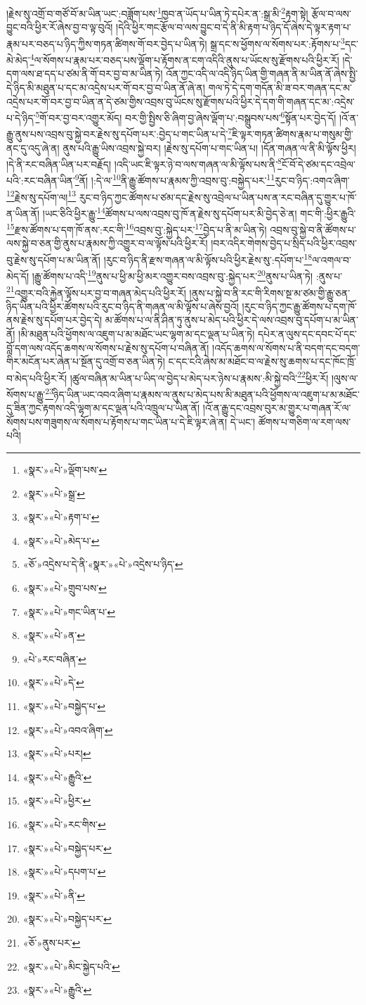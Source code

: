 །རྗེས་སུ་འགྲོ་བ་གཙོ་བོ་མ་ཡིན་ཡང་:བཟློག་པས་\footnote{«སྣར་»«པེ་»ལྡོག་པས་}ཁྱབ་ན་ཡོད་པ་ཡིན་ཏེ་དཔེར་ན་:སྒྲ་མི་\footnote{«སྣར་»«པེ་»སྒྲ་}རྟག་སྟེ། རྩོལ་བ་ལས་བྱུང་བའི་ཕྱིར་རོ་ཞེས་བྱ་བ་ལྟ་བུའོ། །དེའི་ཕྱིར་གང་རྩོལ་བ་ལས་བྱུང་བ་དེ་ནི་མི་རྟག་པ་ཉིད་དོ་ཞེས་དེ་ལྟར་རྟག་པ་རྣམ་པར་བཅད་པ་ཉིད་ཀྱིས་གཏན་ཚིགས་གོ་བར་བྱེད་པ་ཡིན་ཏེ། སྒྲ་དང་ས་ཕྱོགས་ལ་སོགས་པར་:རྟོགས་པ་\footnote{«སྣར་»«པེ་»རྟག་པ་}དང་མེ་མེད་\footnote{«སྣར་»«པེ་»མེད་པ་}ལ་སོགས་པ་རྣམ་པར་བཅད་པས་ལྡོག་པ་རྟོགས་ན་ངག་འདིའི་ནུས་པ་ཡོངས་སུ་རྫོགས་པའི་ཕྱིར་རོ། །དེ་དག་ལས་ཐ་དད་པ་ཙམ་ནི་གོ་བར་བྱ་བ་མ་ཡིན་ཏེ། འོན་ཀྱང་འདི་ལ་འདི་ཉིད་ཡིན་གྱི་གཞན་ནི་མ་ཡིན་ནོ་ཞེས་སྤྱི་དེ་ཉིད་མི་མཐུན་པ་དང་མ་འདྲེས་པར་གོ་བར་བྱ་བ་ཡིན་ནོ་ཞེ་ན། གལ་ཏེ་དེ་དག་གདོན་མི་ཟ་བར་གཞན་དང་མ་འདྲེས་པར་གོ་བར་བྱ་བ་ཡིན་ན་དེ་ཙམ་གྱིས་འབྲས་བུ་ཡོངས་སུ་རྫོགས་པའི་ཕྱིར་དེ་དག་གི་གཞན་དང་མ་:འདྲེས་པ་དེ་ཉིད་\footnote{«ཅོ་»འདྲེས་པ་དེ་ནི་«སྣར་»«པེ་»འདྲེས་པ་ཉིད་}གོ་བར་བྱ་བར་འགྱུར་མོད། བར་གྱི་སྤྱིས་ཅི་ཞིག་བྱ་ཞེས་ལྡོག་པ་:བསྒྲུབས་པས་\footnote{«སྣར་»«པེ་»གྲུབ་པས་}སྟོན་པར་བྱེད་དོ། །འོ་ན་རྒྱུ་ནུས་པས་འབྲས་བུ་སྐྱེ་བར་རྗེས་སུ་དཔོག་པར་:བྱེད་པ་གང་ཡིན་པ་དེ་\footnote{«སྣར་»«པེ་»གང་ཡིན་པ་}ཇི་ལྟར་གཏན་ཚིགས་རྣམ་པ་གསུམ་གྱི་ནང་དུ་འདུ་ཞེ་ན། ནུས་པའི་རྒྱུ་ཡིས་འབྲས་སྐྱེ་བར། །རྗེས་སུ་དཔོག་པ་གང་ཡིན་པ། །དོན་གཞན་ལ་ནི་མི་ལྟོས་ཕྱིར། །དེ་ནི་རང་བཞིན་ཡིན་པར་བརྗོད། །འདི་ཡང་ཇི་ལྟར་ཉེ་བ་ལས་གཞན་ལ་མི་ལྟོས་པས་ནི་\footnote{«སྣར་»«པེ་»ན་}ངོ་བོ་དེ་ཙམ་དང་འབྲེལ་པའི་:རང་བཞིན་ཡིན་\footnote{«པེ་»རང་བཞིན་}ནོ། །:དེ་ལ་\footnote{«སྣར་»«པེ་»དེ་}ནི་རྒྱུ་ཚོགས་པ་རྣམས་ཀྱི་འབྲས་བུ་:བསྐྱེད་པར་\footnote{«སྣར་»«པེ་»བསྐྱེད་པ་}རུང་བ་ཉིད་:འགའ་ཞིག་\footnote{«སྣར་»«པེ་»འབའ་ཞིག་}རྗེས་སུ་དཔོག་ལ།\footnote{«སྣར་»«པེ་»པར།} རུང་བ་ཉིད་ཀྱང་ཚོགས་པ་ཙམ་དང་རྗེས་སུ་འབྲེལ་པ་ཡིན་པས་ན་རང་བཞིན་དུ་གྱུར་པ་ཁོ་ན་ཡིན་ནོ། །ཡང་ཅིའི་ཕྱིར་རྒྱུ་\footnote{«སྣར་»«པེ་»རྒྱུའི་}ཚོགས་པ་ལས་འབྲས་བུ་ཁོ་ན་རྗེས་སུ་དཔོག་པར་མི་བྱེད་ཅེ་ན། གང་གི་:ཕྱིར་རྒྱུའི་\footnote{«སྣར་»«པེ་»ཕྱིར་}རྫས་ཚོགས་པ་དག་ཁོ་ནས་:རང་གི་\footnote{«སྣར་»«པེ་»རང་གིས་}འབྲས་བུ་:སྐྱེད་པར་\footnote{«སྣར་»«པེ་»བསྐྱེད་པར་}བྱེད་པ་ནི་མ་ཡིན་ཏེ། འབྲས་བུ་སྐྱེ་བ་ནི་ཚོགས་པ་ལས་སྐྱེ་བ་ཅན་གྱི་ནུས་པ་རྣམས་ཀྱི་འགྱུར་བ་ལ་ལྟོས་པའི་ཕྱིར་རོ། །བར་འདིར་གེགས་བྱེད་པ་སྲིད་པའི་ཕྱིར་འབྲས་བུ་རྗེས་སུ་དཔོག་པ་མ་ཡིན་ནོ། །རུང་བ་ཉིད་ནི་རྫས་གཞན་ལ་མི་ལྟོས་པའི་ཕྱིར་རྗེས་སུ་:དཔོག་པ་\footnote{«སྣར་»«པེ་»དཔག་པ་}ལ་འགལ་བ་མེད་དོ། །རྒྱུ་ཚོགས་པ་འདི་\footnote{«སྣར་»«པེ་»ནི་}ནུས་པ་ཕྱི་མ་ཕྱི་མར་འགྱུར་བས་འབྲས་བུ་:སྐྱེད་པར་\footnote{«སྣར་»«པེ་»བསྐྱེད་པར་}ནུས་པ་ཡིན་ཏེ། :ནུས་པ་\footnote{«ཅོ་»ནུས་པར་}འགྱུར་བའི་རྐྱེན་ལྟོས་པར་བྱ་བ་གཞན་མེད་པའི་ཕྱིར་རོ། །ནུས་པ་སྐྱེ་བ་ནི་རང་གི་རིགས་སྔ་མ་ཙམ་གྱི་རྒྱུ་ཅན་ཉིད་ཡིན་པའི་ཕྱིར་ཚོགས་པའི་རུང་བ་ཉིད་ནི་གཞན་ལ་མི་ལྟོས་པ་ཞེས་བྱའོ། །རུང་བ་ཉིད་ཀྱང་རྒྱུ་ཚོགས་པ་དག་ཁོ་ནས་རྗེས་སུ་དཔོག་པར་བྱེད་དེ། མ་ཚོགས་པ་ལ་ནི་ཤིན་ཏུ་ནུས་པ་མེད་པའི་ཕྱིར་དེ་ལས་འབྲས་བུ་དཔོག་པ་མ་ཡིན་ནོ། །མི་མཐུན་པའི་ཕྱོགས་ལ་འཇུག་པ་མ་མཐོང་ཡང་ལྷག་མ་དང་ལྡན་པ་ཡིན་ཏེ། དཔེར་ན་ལུས་དང་དབང་པོ་དང་བློ་དག་ལས་འདོད་ཆགས་ལ་སོགས་པ་རྗེས་སུ་དཔོག་པ་བཞིན་ནོ། །འདོད་ཆགས་ལ་སོགས་པ་ནི་བདག་དང་བདག་གིར་མངོན་པར་ཞེན་པ་སྔོན་དུ་འགྲོ་བ་ཅན་ཡིན་ཏེ། ང་དང་ངའི་ཞེས་མ་མཐོང་བ་ལ་རྗེས་སུ་ཆགས་པ་དང་ཁོང་ཁྲོ་བ་མེད་པའི་ཕྱིར་རོ། །ཚུལ་བཞིན་མ་ཡིན་པ་ཡིད་ལ་བྱེད་པ་མེད་པར་ཉེས་པ་རྣམས་:མི་སྐྱེ་བའི་\footnote{«སྣར་»«པེ་»མིང་སྐྱེད་པའི་}ཕྱིར་རོ། །ལུས་ལ་སོགས་པ་རྒྱུ་\footnote{«སྣར་»«པེ་»རྒྱུའི་}ཉིད་ཡིན་ཡང་འབའ་ཞིག་པ་རྣམས་ལ་ནུས་པ་མེད་པས་མི་མཐུན་པའི་ཕྱོགས་ལ་འཇུག་པ་མ་མཐོང་དུ་ཟིན་ཀྱང་རྟགས་འདི་ལྷག་མ་དང་ལྡན་པའི་འཁྲུལ་པ་ཡིན་ནོ། །འོ་ན་རྒྱུ་དང་འབྲས་བུར་མ་གྱུར་པ་གཞན་རོ་ལ་སོགས་པས་གཟུགས་ལ་སོགས་པ་རྟོགས་པ་གང་ཡིན་པ་དེ་ཇི་ལྟར་ཞེ་ན། དེ་ཡང་། ཚོགས་པ་གཅིག་ལ་རག་ལས་པའི། 